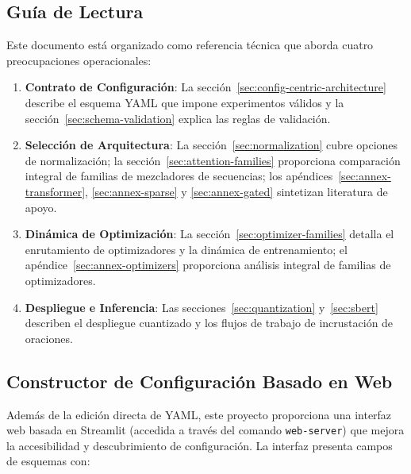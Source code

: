 \documentclass[11pt,a4paper]{article}
\begin{document}
\subsection{Guía de Lectura}

Este documento está organizado como referencia técnica que aborda cuatro preocupaciones operacionales:
\begin{enumerate}[leftmargin=*]
    \item \textbf{Contrato de Configuración}: La sección~\ref{sec:config-centric-architecture} describe el esquema YAML que impone experimentos válidos y la sección~\ref{sec:schema-validation} explica las reglas de validación.
    \item \textbf{Selección de Arquitectura}: La sección~\ref{sec:normalization} cubre opciones de normalización; la sección~\ref{sec:attention-families} proporciona comparación integral de familias de mezcladores de secuencias; los apéndices~\ref{sec:annex-transformer}, \ref{sec:annex-sparse} y \ref{sec:annex-gated} sintetizan literatura de apoyo.
    \item \textbf{Dinámica de Optimización}: La sección~\ref{sec:optimizer-families} detalla el enrutamiento de optimizadores y la dinámica de entrenamiento; el apéndice~\ref{sec:annex-optimizers} proporciona análisis integral de familias de optimizadores.
    \item \textbf{Despliegue e Inferencia}: Las secciones~\ref{sec:quantization} y~\ref{sec:sbert} describen el despliegue cuantizado y los flujos de trabajo de incrustación de oraciones.
\end{enumerate}

\subsection{Constructor de Configuración Basado en Web}

Además de la edición directa de YAML, este proyecto proporciona una interfaz web basada en Streamlit (accedida a través del comando \texttt{web-server}) que mejora la accesibilidad y descubrimiento de configuración. La interfaz presenta campos de esquemas con:
\end{document}
